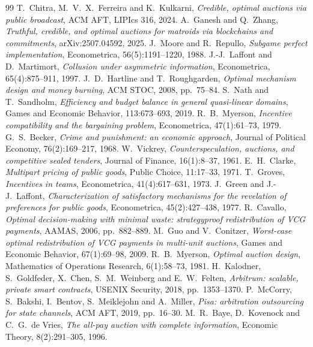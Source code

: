 \documentclass[11pt]{article}
\begin{document}
\begin{thebibliography}{99}
 T.~Chitra, M.~V.~X.~Ferreira and K.~Kulkarni, \emph{Credible, optimal auctions via public broadcast}, ACM AFT, LIPIcs 316, 2024.
 A.~Ganesh and Q.~Zhang, \emph{Truthful, credible, and optimal auctions for matroids via blockchains and commitments}, arXiv:2507.04592, 2025.
 J.~Moore and R.~Repullo, \emph{Subgame perfect implementation}, Econometrica, 56(5):1191--1220, 1988.
 J.-J.~Laffont and D.~Martimort, \emph{Collusion under asymmetric information}, Econometrica, 65(4):875--911, 1997.
 J.~D.~Hartline and T.~Roughgarden, \emph{Optimal mechanism design and money burning}, ACM STOC, 2008, pp.~75--84.
 S.~Nath and T.~Sandholm, \emph{Efficiency and budget balance in general quasi-linear domains}, Games and Economic Behavior, 113:673--693, 2019.
 R.~B.~Myerson, \emph{Incentive compatibility and the bargaining problem}, Econometrica, 47(1):61--73, 1979.
 G.~S.~Becker, \emph{Crime and punishment: an economic approach}, Journal of Political Economy, 76(2):169--217, 1968.
 W.~Vickrey, \emph{Counterspeculation, auctions, and competitive sealed tenders}, Journal of Finance, 16(1):8--37, 1961.
 E.~H.~Clarke, \emph{Multipart pricing of public goods}, Public Choice, 11:17--33, 1971.
 T.~Groves, \emph{Incentives in teams}, Econometrica, 41(4):617--631, 1973.
 J.~Green and J.-J.~Laffont, \emph{Characterization of satisfactory mechanisms for the revelation of preferences for public goods}, Econometrica, 45(2):427--438, 1977.
 R.~Cavallo, \emph{Optimal decision-making with minimal waste: strategyproof redistribution of VCG payments}, AAMAS, 2006, pp.~882--889.
 M.~Guo and V.~Conitzer, \emph{Worst-case optimal redistribution of VCG payments in multi-unit auctions}, Games and Economic Behavior, 67(1):69--98, 2009.
 R.~B.~Myerson, \emph{Optimal auction design}, Mathematics of Operations Research, 6(1):58--73, 1981.
 H.~Kalodner, S.~Goldfeder, X.~Chen, S.~M.~Weinberg and E.~W.~Felten, \emph{Arbitrum: scalable, private smart contracts}, USENIX Security, 2018, pp.~1353--1370.
 P.~McCorry, S.~Bakshi, I.~Bentov, S.~Meiklejohn and A.~Miller, \emph{Pisa: arbitration outsourcing for state channels}, ACM AFT, 2019, pp.~16--30.
 M.~R.~Baye, D.~Kovenock and C.~G.~de Vries, \emph{The all-pay auction with complete information}, Economic Theory, 8(2):291--305, 1996.
\end{thebibliography}
\end{document}
